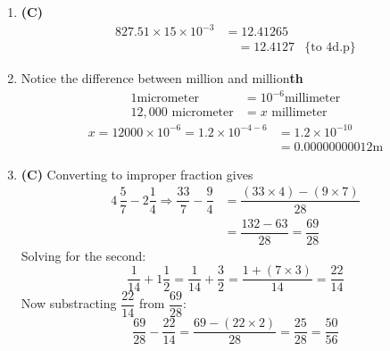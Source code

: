 \begin{multicols}{2}
\begin{enumerate}[label={\textbf{\arabic*.}}]
\begin{enumerate}[label={\arabic*.}]
    \item \textbf{(C)}\begin{align*}
        827.51 \times 15 \times 10^{-3} &= 12.41265 \\
        &\quad = 12.4127  &\text{\{ to 4d.p\}}
        \end{align*}
    \item Notice the difference between million and million\textbf{th} 
    \begin{align*}
     1 \text{micrometer} &= 10^{-6}\text{millimeter} \\
    12,000 \text{ micrometer} &= x \text{ millimeter} 
    \end{align*}
    \begin{align*}
    x = 12000 \times 10^{-6}  = 1.2 \times 10^{-4 -6 } &= 1.2 \times 10^{-10} \\ &= 0.00000000012 \textrm{m}
    \end{align*}

    \item \textbf{(C)} Converting to improper fraction gives 
        \begin{align*}
        4\,\dfrac{5}{7} - 2\dfrac{1}{4} \Rightarrow \dfrac{33}{7} - \dfrac{9}{4} &= \dfrac{(33\times 4) - (9 \times 7) }{28}  \\
        &= \dfrac{132 - 63}{28} = \dfrac{69}{28} 
        \end{align*}
        Solving for the second:
        \[\dfrac{1}{14} + 1\dfrac{1}{2} = \dfrac{1}{14} + \dfrac{3}{2} = \dfrac{1 + (7 \times 3)}{14} = \dfrac{22}{14}\] 
        Now substracting $\dfrac{22}{14}$ from $\dfrac{69}{28}$: 
        \[\dfrac{69}{28} - \dfrac{22}{14} = \dfrac{69 - (22 \times 2)}{28} =  \dfrac{25}{28} = \dfrac{50}{56}\]


\end{enumerate}
\end{enumerate}
\end{multicols}
